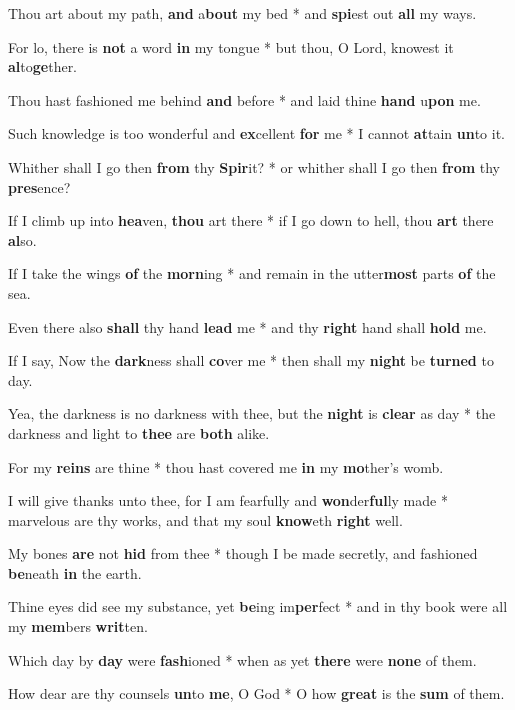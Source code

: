 \begin{multicols}{2}
	Thou art about my path, \textbf{and} a\textbf{bout} my bed * and \textbf{spi}est out \textbf{all} my ways.
	
	For lo, there is \textbf{not} a word \textbf{in} my tongue * but thou, O Lord, knowest it \textbf{al}to\textbf{ge}ther.
	
	Thou hast fashioned me behind \textbf{and} before * and laid thine \textbf{hand} u\textbf{pon} me.
	
	Such knowledge is too wonderful and \textbf{ex}cellent \textbf{for} me * I cannot \textbf{at}tain \textbf{un}to it.
	
	Whither shall I go then \textbf{from} thy \textbf{Spir}it? * or whither shall I go then \textbf{from} thy \textbf{pres}ence?
	
	If I climb up into \textbf{hea}ven, \textbf{thou} art there * if I go down to hell, thou \textbf{art} there \textbf{al}so.
	
	If I take the wings \textbf{of} the \textbf{morn}ing * and remain in the utter\textbf{most} parts \textbf{of} the sea.
	
	Even there also \textbf{shall} thy hand \textbf{lead} me * and thy \textbf{right} hand shall \textbf{hold} me.
	
	If I say, Now the \textbf{dark}ness shall \textbf{co}ver me * then shall my \textbf{night} be \textbf{turned} to day.
	
	Yea, the darkness is no darkness with thee, but the \textbf{night} is \textbf{clear} as day * the darkness and light to \textbf{thee} are \textbf{both} alike.
	
	For my \textbf{reins} are thine * thou hast covered me \textbf{in} my \textbf{mo}ther's womb.
	
	I will give thanks unto thee, for I am fearfully and \textbf{won}der\textbf{ful}ly made * marvelous are thy works, and that my soul \textbf{know}eth \textbf{right} well.
	
	My bones \textbf{are} not \textbf{hid} from thee * though I be made secretly, and fashioned \textbf{be}neath \textbf{in} the earth.
	
	Thine eyes did see my substance, yet \textbf{be}ing im\textbf{per}fect * and in thy book were all my \textbf{mem}bers \textbf{writ}ten.
	
	Which day by \textbf{day} were \textbf{fash}ioned * when as yet \textbf{there} were \textbf{none} of them.
	
	How dear are thy counsels \textbf{un}to \textbf{me}, O God * O how \textbf{great} is the \textbf{sum} of them.
	

\end{multicols}
